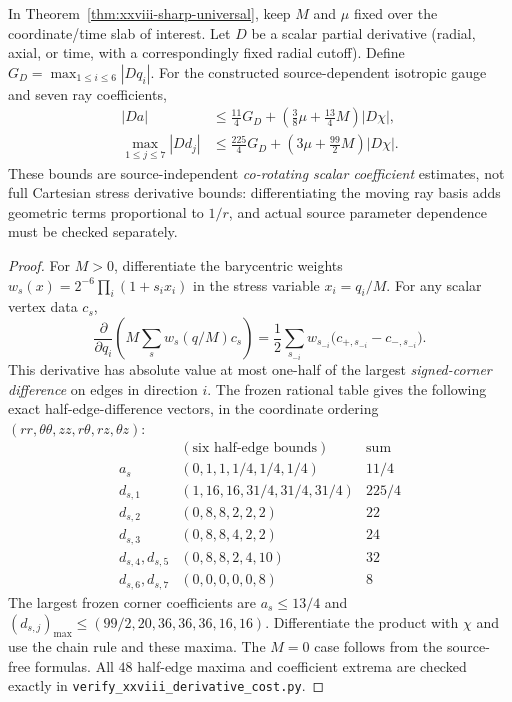 \begin{proposition}
\label{prop:xxviii-derivative-cost}
In Theorem~\ref{thm:xxviii-sharp-universal}, keep $M$ and
$\mu$ fixed over the coordinate/time slab of interest.
Let $D$ be a scalar partial derivative (radial, axial, or
time, with a correspondingly fixed radial cutoff).
Define
$G_D=\max_{1\le i\le6}|Dq_i|$.
For the constructed source-dependent isotropic gauge and
seven ray coefficients,
\begin{equation}\label{eq:xxviii-derivative-cost}
\boxed{\begin{aligned}
|Da|&\le\frac{11}{4}G_D+
 \left(\frac38\mu+\frac{13}{4}M\right)|D\chi|,\\
\max_{1\le j\le7}|Dd_j|
&\le\frac{225}{4}G_D+
 \left(3\mu+\frac{99}{2}M\right)|D\chi|.
\end{aligned}}
\end{equation}
These bounds are source-independent \emph{co-rotating scalar
coefficient} estimates, not full Cartesian stress derivative
bounds: differentiating the moving ray basis adds geometric
terms proportional to $1/r$, and actual source parameter
dependence must be checked separately.
\end{proposition}
\begin{proof}
For $M>0$, differentiate the barycentric weights
$w_s(x)=2^{-6}\prod_i(1+s_ix_i)$ in the stress variable
$x_i=q_i/M$. For any scalar vertex data $c_s$,
\[
\frac{\partial}{\partial q_i}
\left(M\sum_s w_s(q/M)c_s\right)
=\frac12\sum_{s_{-i}}w_{s_{-i}}
\bigl(c_{+,s_{-i}}-c_{-,s_{-i}}\bigr).
\]
This derivative has absolute value at most one-half of the
largest \emph{signed-corner difference} on edges in direction
$i$. The frozen rational table gives the following exact
half-edge-difference vectors, in the coordinate ordering
$(rr,\theta\theta,zz,r\theta,rz,\theta z)$:
\[
\begin{array}{c|c|c}
&(\text{six half-edge bounds})&\text{sum}\\\hline
a_s&(0,1,1,1/4,1/4,1/4)&11/4\\
d_{s,1}&(1,16,16,31/4,31/4,31/4)&225/4\\
d_{s,2}&(0,8,8,2,2,2)&22\\
d_{s,3}&(0,8,8,4,2,2)&24\\
d_{s,4},d_{s,5}&(0,8,8,2,4,10)&32\\
d_{s,6},d_{s,7}&(0,0,0,0,0,8)&8
\end{array}
\]
The largest frozen corner coefficients are
$a_s\le13/4$ and
$(d_{s,j})_{\max}\le(99/2,20,36,36,36,16,16)$.
Differentiate the product with $\chi$ and use
the chain rule and these maxima. The $M=0$ case follows
from the source-free formulas. All $48$ half-edge maxima
and coefficient extrema are checked exactly in
\texttt{verify\_xxviii\_derivative\_cost.py}.
\end{proof}

